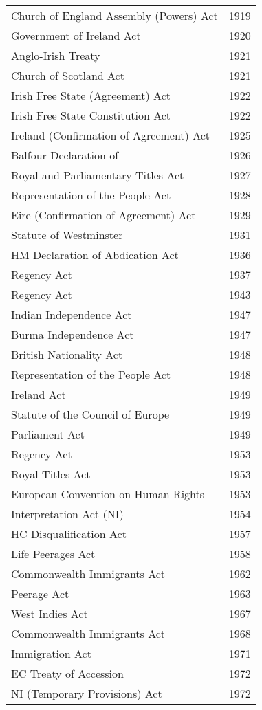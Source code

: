 \documentclass[14pt,titlepage]{extarticle}
\begin{document}
{\begin{longtable}{l l}
Church of England Assembly (Powers) Act & 1919\\
Government of Ireland Act & 1920\\
Anglo-Irish Treaty & 1921\\
Church of Scotland Act  & 1921\\
Irish Free State (Agreement) Act & 1922\\
Irish Free State Constitution Act & 1922\\
Ireland (Confirmation of Agreement) Act &  1925\\
Balfour Declaration of &  1926\\
Royal and Parliamentary Titles Act & 1927\\
Representation of the People Act &  1928\\
Eire (Confirmation of Agreement) Act &  1929\\
Statute of Westminster & 1931\\
HM Declaration of Abdication Act &  1936\\
Regency Act &  1937\\
Regency Act  & 1943\\
Indian Independence Act & 1947\\
Burma Independence Act & 1947\\
British Nationality Act &  1948\\
Representation of the People Act &  1948\\
Ireland Act  & 1949\\
Statute of the Council of Europe & 1949\\
Parliament Act  & 1949\\
Regency Act  & 1953\\
Royal Titles Act  & 1953\\
European Convention on Human Rights & 1953\\
Interpretation Act (NI) & 1954\\
HC Disqualification Act  & 1957\\
Life Peerages Act & 1958\\
Commonwealth Immigrants Act  & 1962\\
Peerage Act & 1963\\
West Indies Act &  1967\\
Commonwealth Immigrants Act  & 1968\\
Immigration Act & 1971\\
EC Treaty of Accession & 1972\\
NI (Temporary Provisions) Act & 1972\\

\end{longtable}}
\end{document}
